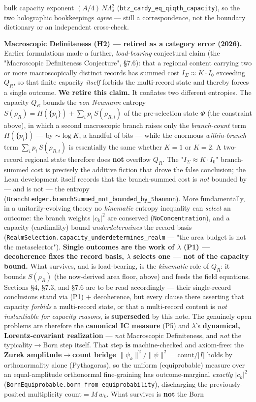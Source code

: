 \documentclass[11pt,a4paper]{article}
\begin{document}
bulk capacity exponent $(A/4)\,N\Lambda_s^2$ (\texttt{btz\_cardy\_eq\_qiqth\_capacity}), so the two holographic bookkeepings \emph{agree} — still a correspondence, not the boundary dictionary or an independent cross-check.

\textbf{Macroscopic Definiteness (H2) — retired as a category error (2026).} Earlier formulations made a further, \emph{load-bearing} conjectural claim (the "Macroscopic Definiteness Conjecture", §7.6): that a regional content carrying two or more macroscopically distinct records has summed cost $I_\Sigma \approx K\cdot I_0$ exceeding $Q_R$, so that finite capacity \emph{itself} forbids the multi-record state and thereby forces a single outcome. \textbf{We retire this claim.} It conflates two different entropies. The capacity $Q_R$ bounds the \emph{von Neumann} entropy $S(\rho_R) = H(\{p_i\}) + \sum_i p_i\,S(\rho_{R,i})$ of the pre-selection state $\Phi$ (the constraint above), in which a second macroscopic branch raises only the \emph{branch-count} term $H(\{p_i\})$ — by $\sim\!\log K$, a handful of bits — while the enormous \emph{within-branch} term $\sum_i p_i\,S(\rho_{R,i})$ is essentially the same whether $K=1$ or $K=2$. A two-record regional state therefore does \textbf{not} overflow $Q_R$. The "$I_\Sigma \approx K\cdot I_0$" branch-summed cost is precisely the additive fiction that drove the false conclusion; the Lean development itself records that the branch-summed cost is \emph{not} bounded by — and is not — the entropy (\texttt{BranchLedger.branchSummed\_not\_bounded\_by\_Shannon}). More fundamentally, in a unitarily-evolving theory no \emph{kinematic} entropy inequality can \emph{select} an outcome: the branch weights $|c_k|^2$ are conserved (\texttt{NoConcentration}), and a capacity (cardinality) bound \emph{underdetermines} the record basis (\texttt{RealmSelection.capacity\_underdetermines\_realm} — "the area budget is not the metaselector"). \textbf{Single outcomes are the work of $\lambda$ (P1) — decoherence fixes the record basis, $\lambda$ selects one — not of the capacity bound.} What survives, and is load-bearing, is the \emph{kinematic} role of $Q_R$: it bounds $S(\rho_R)$ (the now-derived area floor, above) and feeds the field equations. Sections §4, §7.3, and §7.6 are to be read accordingly — their single-record conclusions stand via (P1) + decoherence, but every clause there asserting that capacity \emph{forbids} a multi-record state, or that a multi-record content is \emph{not instantiable for capacity reasons}, is \textbf{superseded} by this note. The genuinely open problems are therefore the \textbf{canonical IC measure} (P5) and $\lambda$'s \textbf{dynamical, Lorentz-covariant realization} — \emph{not} Macroscopic Definiteness, and \emph{not} the typicality$\to$Born step itself. That step \textbf{is} machine-checked and axiom-free: the \textbf{Zurek amplitude$\to$count bridge} $\|\psi_k\|^2/\|\psi\|^2 = \mathrm{count}/|I|$ holds by orthonormality alone (Pythagoras), so the uniform (equiprobable) measure over an equal-amplitude orthonormal fine-graining has outcome-marginal \emph{exactly} $|c_k|^2$ (\texttt{BornEquiprobable.born\_from\_equiprobability}), discharging the previously-posited multiplicity $\mathrm{count}=M\,w_k$. What survives is \textbf{not} the Born 
\end{document}

